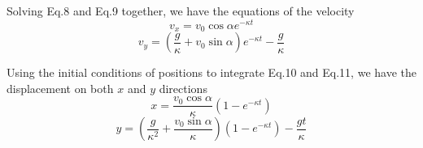 \documentclass[12pt]{report}
\begin{document}
Solving Eq.8 and Eq.9 together, we have the equations of the velocity
\begin{equation}
    v_x=v_0\cos{\alpha}e^{-\kappa t}
\end{equation}
\begin{equation}
    v_y=(\dfrac{g}{\kappa}+v_0\sin{\alpha})e^{-\kappa t}-\dfrac{g}{\kappa}
\end{equation}

Using the initial conditions of positions to integrate Eq.10 and Eq.11, we have the displacement on both $x$ and $y$ directions
\begin{equation}
    x=\dfrac{v_0\cos{\alpha}}{\kappa}(1-e^{-\kappa t})
\end{equation}
\begin{equation}
    y=(\dfrac{g}{\kappa^2}+\dfrac{v_0\sin{\alpha}}{\kappa})(1-e^{-\kappa t})-\dfrac{gt}{\kappa}
\end{equation}
\end{document}
